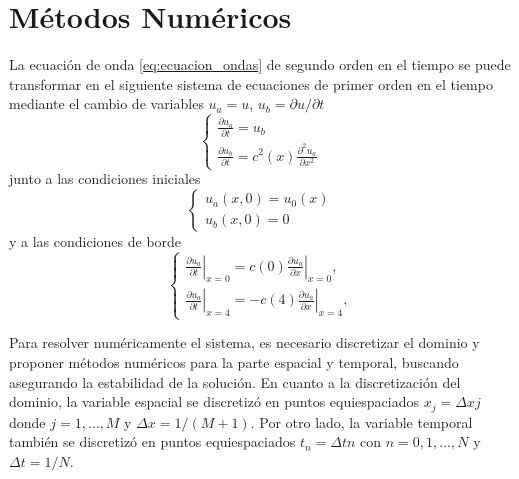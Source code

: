 \documentclass[aps,prb,twocolumn,superscriptaddress,floatfix,longbibliography,10pt]{revtex4-2}
\newcounter{para}
\begin{document}
\section{Métodos Numéricos}

La ecuación de onda \ref{eq:ecuacion_ondas} de segundo orden en el tiempo se puede transformar en el siguiente sistema de ecuaciones de primer orden en el tiempo mediante el cambio de variables $u_a = u$, $u_b = \partial u /\partial t$
\[
  \left \{ \begin{matrix}
     \frac{\partial u_a}{\partial t} = u_b   \\
     \frac{\partial u_b}{\partial t} = c^2(x) \frac{\partial^2 u_a}{\partial x^2}
  \end{matrix} \right .
  \]
junto a las condiciones iniciales
\[ \left \{ \begin{matrix}
     u_a(x,0) = u_0(x) \\
     u_b(x,0) = 0
  \end{matrix} \right .
\]  
y a las condiciones de borde
\[
  \left \{ \begin{matrix}
     \left . \frac{\partial u_a}{\partial t} \right |_{x=0} = c(0) \left . \frac{\partial u_a}{\partial x} \right |_{x=0} ,\\
     \left . \frac{\partial u_a}{\partial t} \right |_{x=4} = - c(4) \left . \frac{\partial u_a}{\partial x} \right |_{x=4},
  \end{matrix} \right .
\]

Para resolver numéricamente el sistema, es necesario discretizar el dominio y proponer métodos numéricos para la parte espacial y temporal, buscando asegurando la estabilidad de la solución. En cuanto a la discretización del dominio, la variable espacial se discretizó en puntos equiespaciados $x_j = \Delta x  j$ donde $j = 1,\dots,M$ y $\Delta x = 1/(M+1)$. Por otro lado, la variable temporal también se discretizó en puntos equiespaciados $t_n = \Delta t n$ con $n = 0,1,\dots,N$ y $\Delta t = 1/N$.
\end{document}
